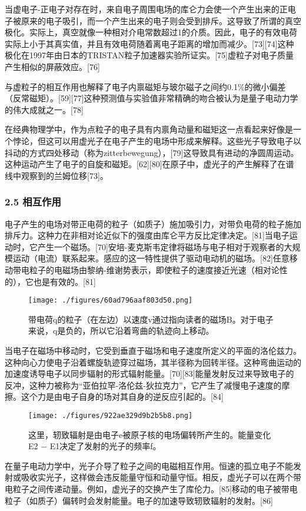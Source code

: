 当虚电子-正电子对存在时，来自电子周围电场的库仑力会使一个产生出来的正电子被原来的电子吸引，而一个产生出来的电子则会受到排斥。这导致了所谓的真空极化。实际上，真空就像一种相对介电常数超过1的介质。因此，电子的有效电荷实际上小于其真实值，并且有效电荷随着离电子距离的增加而减少。[73][74]这种极化在1997年由日本的TRISTAN粒子加速器实验所证实。[75]虚粒子对电子质量产生相似的屏蔽效应。[76]

与虚粒子的相互作用也解释了电子内禀磁矩与玻尔磁子之间约0.1\%的微小偏差（反常磁矩）。[59][77]这种预测值与实验值非常精确的吻合被认为是量子电动力学的伟大成就之一。[78]

在经典物理学中，作为点粒子的电子具有内禀角动量和磁矩这一点看起来好像是一个悖论，但这可以用虚光子在电子产生的电场中形成来解释。这些光子导致电子以抖动的方式四处移动（称为zitterbewegung），[79]这导致具有进动的净圆周运动。这种运动产生了电子的自旋和磁矩。[62][80]在原子中，虚光子的产生解释了在谱线中观察到的兰姆位移[73]。
\subsubsection{2.5 相互作用}
电子产生的电场对带正电荷的粒子（如质子）施加吸引力，对带负电荷的粒子施加排斥力。这种力在非相对论近似下的强度由库仑平方反比定律决定。[81]当电子运动时，它产生一个磁场。[70]安培-麦克斯韦定律将磁场与电子相对于观察者的大规模运动（电流）联系起来。感应的这一特性提供了驱动电动机的磁场。[82]任意移动带电粒子的电磁场由黎纳-维谢势表示，即使粒子的速度接近光速（相对论性的），它也是有效的。[81]
\begin{figure}[ht]
\centering
\texttt{[image: ./figures/60ad796aaf803d50.png]}
\caption{带电荷q的粒子（在左边）以速度v通过指向读者的磁场B。对于电子来说，q是负的，所以它沿着弯曲的轨迹向上移动。} \label{fig_DZ_8}
\end{figure}
当电子在磁场中移动时，它受到垂直于磁场和电子速度所定义的平面的洛伦兹力。这种向心力使电子沿着螺旋轨迹穿过磁场，其半径称为回转半径。这种弯曲运动的加速度诱导电子以同步辐射的形式辐射能量。[70][83]能量发射反过来导致电子的反冲，这种力被称为“亚伯拉罕-洛伦兹-狄拉克力”，它产生了减慢电子速度的摩擦。这个力是由电子自身的场对其自身的逆反应引起的。[84]
\begin{figure}[ht]
\centering
\texttt{[image: ./figures/922ae329d9b2b5b8.png]}
\caption{这里，轫致辐射是由电子e被原子核的电场偏转所产生的。能量变化E2 − E1决定了发射的光子的频率f。} \label{fig_DZ_9}
\end{figure}
在量子电动力学中，光子介导了粒子之间的电磁相互作用。恒速的孤立电子不能发射或吸收实光子，这样做会违反能量守恒和动量守恒。相反，虚光子可以在两个带电粒子之间传递动量。例如，虚光子的交换产生了库伦力。[85]移动的电子被带电粒子（如质子）偏转时会发射能量。电子的加速导致轫致辐射的发射。[86]

